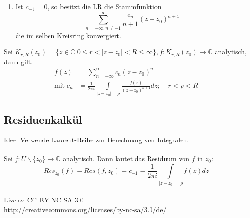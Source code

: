 \documentclass[4pt,a4paper]{scrartcl}
\begin{document}
\begin{multicols}{4}
\begin{enumerate}
\item Ist $c_{-1}=0$, so besitzt die LR die Stammfunktion
\begin{equation*}
\sum\limits_{n=-\infty,n\neq -1}^{\infty}\frac{c_n}{n+1}(z-z_0)^{n+1}
\end{equation*}
die im selben Kreisring konvergiert.
\end{enumerate}
Sei $K_{r,R}(z_0)=\{z\in\mathbb{C}|0\leq r<|z-z_0|<R\leq\infty\},f:K_{r,R}(z_0)\rightarrow\mathbb{C}$ analytisch, dann gilt:
\begin{equation*}
\begin{split}
f(z)&=\sum\limits_{n=-\infty}^{\infty}c_n(z-z_0)^n\\
\text{mit }c_n&=\frac{1}{2\pi i}\int\limits_{|z-z_0|=\rho}\frac{f(z)}{(z-z_0)^{n+1}}dz;\;\;\;\;r<\rho<R
\end{split}
\end{equation*}

\subsection{Residuenkalkül}
Idee: Verwende Laurent-Reihe zur Berechnung von Integralen.\\\\
Sei $f:U\backslash\{z_0\}\rightarrow\mathbb{C}$ analytisch. Dann lautet das Residuum von $f$ in $z_0$:
\begin{equation*}
Res_{z_0}(f)=Res(f,z_0)=c_{-1}=\frac{1}{2\pi i}\int\limits_{|z-z_0|=\rho}f(z)dz
\end{equation*}
\\
Lizenz: CC BY-NC-SA 3.0\\
\url{http://creativecommons.org/licenses/by-nc-sa/3.0/de/}

\end{multicols}
\end{document}
